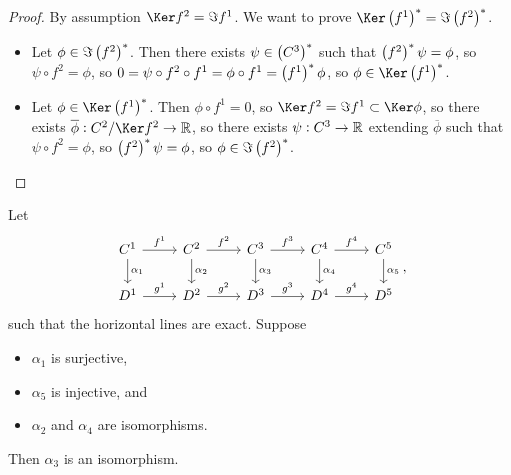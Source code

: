 \begin{proof}
By assumption $ \Ker f^2 = \Im f^1 $. We want to prove $ \Ker \br{f^1}^* = \Im \br{f^2}^* $.
\begin{itemize}
\item Let $ \phi \in \Im \br{f^2}^* $. Then there exists $ \psi \in \br{C^3}^* $ such that $ \br{f^2}^*\psi = \phi $, so $ \psi \circ f^2 = \phi $, so $ 0 = \psi \circ f^2 \circ f^1 = \phi \circ f^1 = \br{f^1}^*\phi $, so $ \phi \in \Ker \br{f^1}^* $.
\item Let $ \phi \in \Ker \br{f^1}^* $. Then $ \phi \circ f^1 = 0 $, so $ \Ker f^2 = \Im f^1 \subset \Ker \phi $, so there exists $ \overline{\phi} : C^2 / \Ker f^2 \to \RR $, so there exists $ \psi : C^3 \to \mathbb{R} $ extending $ \overline{\phi} $ such that $ \psi \circ f^2 = \phi $, so $ \br{f^2}^*\psi = \phi $, so $ \phi \in \Im \br{f^2}^* $.
\end{itemize}
\end{proof}

\begin{lemma}
Let
$$
\begin{tikzcd}
C^1 \arrow{r}{f^1} \arrow{d}{\alpha_1} & C^2 \arrow{r}{f^2} \arrow{d}{\alpha_2} & C^3 \arrow{r}{f^3} \arrow{d}{\alpha_3} & C^4 \arrow{r}{f^4} \arrow{d}{\alpha_4} & C^5 \arrow{d}{\alpha_5} \\
D^1 \arrow{r}{g^1} & D^2 \arrow{r}{g^2} & D^3 \arrow{r}{g^3} & D^4 \arrow{r}{g^4} & D^5
\end{tikzcd},
$$
such that the horizontal lines are exact. Suppose
\begin{itemize}
\item $ \alpha_1 $ is surjective,
\item $ \alpha_5 $ is injective, and
\item $ \alpha_2 $ and $ \alpha_4 $ are isomorphisms.
\end{itemize}
Then $ \alpha_3 $ is an isomorphism.
\end{lemma}

